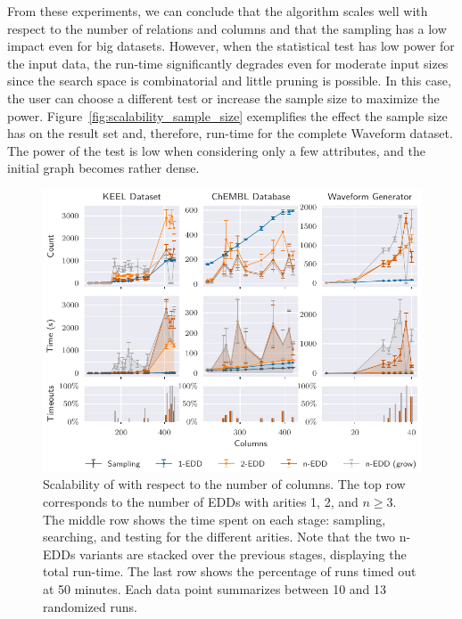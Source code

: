 From these experiments, we can conclude that the algorithm scales well 
with respect to the number of relations and columns and that the sampling has a low impact even for big datasets.
However, when the statistical test has low power for the input data, the run-time significantly degrades even for moderate input sizes since the search space is combinatorial and little
pruning is possible. In this case, the user can choose a different test or increase the sample size to maximize the
power. Figure~\ref{fig:scalability_sample_size} exemplifies the effect the sample size has on the result
set and, therefore, run-time for the complete Waveform dataset. The power of the test is low when considering only a few attributes, and the initial graph becomes rather dense.

\begin{figure}[htb]
    \centering
    \includegraphics{images/5_presq/scalability}
    \caption[Scalability of \PresQ with respect to the number of columns.]{
        Scalability of \PresQ with respect to the number of columns.
        The top row corresponds to the number of \glspl{EDD} with arities 1, 2, and $n \ge 3$.
        The middle row shows the time spent on each stage: sampling, searching, and testing for the different arities.
        Note that the two n-EDDs variants are stacked over the previous stages, displaying the total run-time.
        The last row shows the percentage of runs timed out at 50 minutes.
        Each data point summarizes between 10 and 13 randomized runs.
    }
    \label{fig:scalability}
\end{figure}


